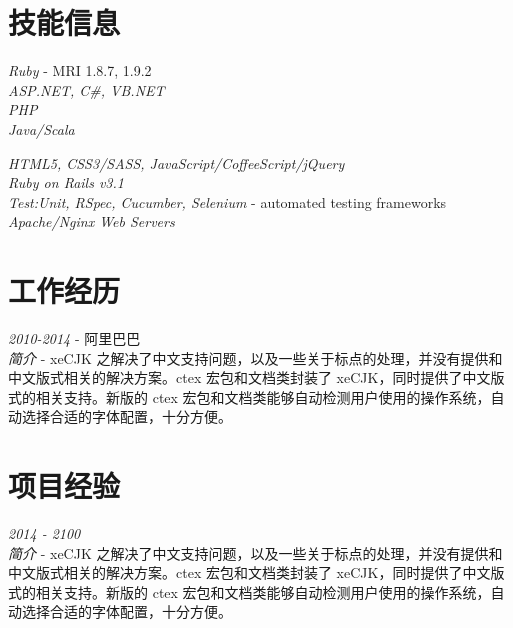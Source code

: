 \documentclass[10pt]{article} %
\begin{document}

\section{ 技能信息}

{
\textit{Ruby} - MRI 1.8.7, 1.9.2\\
\textit{ASP.NET, C\#, VB.NET}\\
\textit{PHP}\\
\textit{Java/Scala}
}


{
\textit{HTML5, CSS3/SASS, JavaScript/CoffeeScript/jQuery}\\
\textit{Ruby on Rails v3.1}\\
\textit{Test:Unit, RSpec, Cucumber, Selenium} - automated testing frameworks\\
\textit{Apache/Nginx Web Servers}\\
}



\section{工作经历}

{
\textit{2010-2014} - 阿里巴巴\\
\textit{简介} -  xeCJK 之解决了中文支持问题，以及一些关于标点的处理，并没有提供和中文版式相关的解决方案。ctex 宏包和文档类封装了 xeCJK，同时提供了中文版式的相关支持。新版的 ctex 宏包和文档类能够自动检测用户使用的操作系统，自动选择合适的字体配置，十分方便。\\
}

\section{项目经验}

{
\textit{2014 - 2100} \\
\textit{简介} -  xeCJK 之解决了中文支持问题，以及一些关于标点的处理，并没有提供和中文版式相关的解决方案。ctex 宏包和文档类封装了 xeCJK，同时提供了中文版式的相关支持。新版的 ctex 宏包和文档类能够自动检测用户使用的操作系统，自动选择合适的字体配置，十分方便。\\
}
\end{document}
